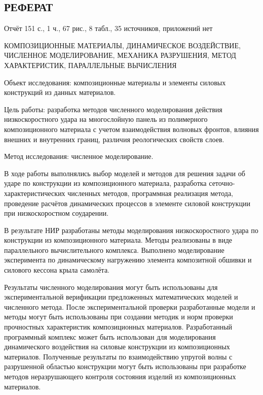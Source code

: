 \begin{center}\section*{РЕФЕРАТ}\end{center}

Отчёт 151 с., 1 ч., 67 рис., 8 табл., 35 источников, приложений нет

КОМПОЗИЦИОННЫЕ МАТЕРИАЛЫ, ДИНАМИЧЕСКОЕ ВОЗДЕЙСТВИЕ, ЧИСЛЕННОЕ МОДЕЛИРОВАНИЕ, МЕХАНИКА РАЗРУШЕНИЯ, МЕТОД ХАРАКТЕРИСТИК, ПАРАЛЛЕЛЬНЫЕ ВЫЧИСЛЕНИЯ

Объект исследования: композиционные материалы и элементы силовых конструкций из данных материалов.

Цель работы: разработка методов численного моделирования действия низкоскоростного удара на многослойную панель из полимерного композиционного материала с учетом взаимодействия волновых фронтов, влияния внешних и внутренних границ, различия реологических свойств слоев.

Метод исследования: численное моделирование.

В ходе работы выполнялись выбор моделей и методов для решения задачи об ударе по конструкции из композиционного материала, разработка сеточно-характеристических численных методов, программная реализация метода, проведение расчётов динамических процессов в элементе силовой конструкции при низкоскоростном соударении.

В результате НИР разработаны методы моделирования низкоскоростного удара по конструкции из композиционного материала. Методы реализованы в виде параллельного вычислительного комплекса. Выполнено моделирование эксперимента по динамическому нагружению элемента композитной обшивки и силового кессона крыла самолёта. 

Результаты численного моделирования могут быть использованы для экспериментальной верификации предложенных математических моделей и численного метода. После экспериментальной проверки разработанные модели и методы могут быть использованы при создании методик и норм проверки прочностных характеристик композиционных материалов. Разработанный программный комплекс может быть использован для моделирования динамического воздействия на силовые конструкции из композиционных материалов. Полученные результаты по взаимодействию упругой волны с разрушенной областью конструкции могут быть использованы при разработке методов неразрушающего контроля состояния изделий из композиционных материалов.
